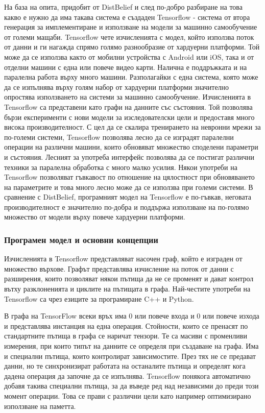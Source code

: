 На база на опита, придобит от DistBelief и след по-добро разбиране на това какво е нужно да има такава система е създаден Tensorflow - система от втора генерация за имплементиране и използване на модели за машинно самообучение от големи мащаби. Tensorflow чете изчисленията с модел, който използва поток от данни и ги нагажда спрямо голямо разнообразие от хардуерни платформи. Той може да се използва както от мобилни устройства с Android или iOS, така и от отделни машини с една или повече видео карти. Налична е поддръжката и на паралелна работа върху много машини. Разполагайки с една система, която може да се изпълнява върху голям набор от хардуерни платформи значително опростява използването на системи за машинно самообучение. Изчисленията в Tensorflow са представени като графи на данните със състояния. Той позволява бързи експерименти с нови модели за изследователски цели и предоставя много висока производителност. С цел да се скалира тренирането на невронни мрежи за по-големи системи, Tensorflow позволява лесно да се изградят паралелни операции на различни машини, които обновяват множество споделени параметри и състояния. Лесният за употреба интерфейс позволява да се постигат различни техники за паралелна обработка с много малко усилия. Някои употреби на Tensorflow позволяват гъвкавост по отношение на цялостност при обновяването на параметрите и това много лесно може да се използва при големи системи. В сравнение с DistBelief, програмният модел на Tensorflow е по-гъвкав, неговата производителност е значително по-добра и поддържа използване на по-голямо множество от модели върху повече хардуерни платформи.

\subsubsection{Програмен модел и основни концепции}

Изчисленията в Tensorflow представляват насочен граф, който е изграден от множество върхове. Графът представлява изчисление на поток от данни с разширения, които позволяват някои пътища да не се променят и дават контрол вътху разклоненията и циклите на пътищата в графа. Най-честите употреби на Tensorflow са чрез езиците за програмиране C++ и Python.

В графа на TensorFlow всеки връх има 0 или повече входа и 0 или повече изхода и представлява инстанция на една операция. Стойности, които се пренасят по стандартните пътища в графа се наричат тензори. Те са масиви с променливи измерения, при които типът на данните се определя при създаване на графа. Има и специални пътища, които контролират зависимостите. През тях не се предават данни, но те синхронизират работата на останалите пътища и определят кога дадена операция да започне да се изпълнява. Tensorflow понякога автоматично добавя такива специални пътища, за да въведе ред над независими до преди този момент операции. Това се прави с различни цели като например оптимизирано използване на паметта.\\

